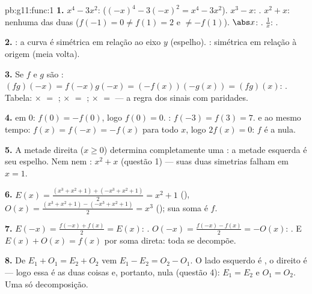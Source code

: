 \begin{solution}{pb:g11:func:1}
\textbf{1.} $x^4 - 3x^2$:  ($(-x)^4 - 3(-x)^2 = x^4 -
3x^2$). $x^3 - x$: . $x^2 + x$: nenhuma das duas
($f(-1) = 0 \neq f(1) = 2$ e $\neq -f(1)$). $\abs x$: .
$\frac1x$: .

\textbf{2.} : a curva é simétrica em relação ao eixo $y$
(espelho). : simétrica em relação à origem (meia volta).

\textbf{3.} Se $f$ e $g$ são :
$(fg)(-x) = f(-x)g(-x) = (-f(x))(-g(x)) = (fg)(x)$: .
Tabela:  $\times$  $=$ ;  $\times$  $=$ ;
 $\times$  $=$  --- a regra dos sinais com
paridades.

\textbf{4.}  em $0$: $f(0) = -f(0)$, logo $f(0) = 0$. :
$f(-3) = f(3) = 7$.  e  ao mesmo tempo:
$f(x) = f(-x) = -f(x)$ para todo $x$, logo $2f(x) = 0$: $f$ é a
 nula.

\textbf{5.} A metade direita ($x \geq 0$) determina
completamente uma : a metade esquerda é seu espelho.
Nem  nem : $x^2 + x$ (questão 1) --- suas duas
simetrias falham em $x = 1$.

\textbf{6.} $E(x) = \frac{(x^3 + x^2 + 1) + (-x^3 + x^2 +
1)}{2} = x^2 + 1$ (), $O(x) = \frac{(x^3 + x^2 + 1) -
(-x^3 + x^2 + 1)}{2} = x^3$ (); sua soma é $f$.

\textbf{7.} $E(-x) = \frac{f(-x) + f(x)}{2} = E(x)$: .
$O(-x) = \frac{f(-x) - f(x)}{2} = -O(x)$: . E
$E(x) + O(x) = f(x)$ por soma direta: toda  se
decompõe.

\textbf{8.} De $E_1 + O_1 = E_2 + O_2$ vem
$E_1 - E_2 = O_2 - O_1$. O lado esquerdo é , o direito é
 --- logo essa  é as duas coisas e, portanto, nula
(questão 4): $E_1 = E_2$ e $O_1 = O_2$. Uma só decomposição.


\end{solution}
